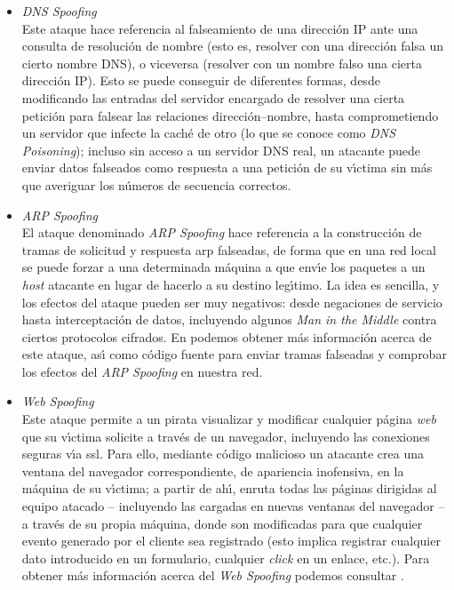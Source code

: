 \begin{itemize}
\item{\it DNS Spoofing}\\
Este ataque hace referencia al falseamiento de una direcci\'on IP ante una 
consulta de resoluci\'on de nombre (esto es, resolver con una direcci\'on falsa 
un cierto nombre DNS), o viceversa (resolver con un nombre falso una cierta
direcci\'on IP). Esto se puede conseguir de diferentes formas, desde modificando
las entradas del servidor encargado de resolver una cierta petici\'on para 
falsear las relaciones direcci\'on--nombre, hasta comprometiendo un servidor 
que infecte la cach\'e de otro (lo que se conoce como {\it DNS Poisoning});
incluso sin acceso a un servidor DNS real, un atacante puede enviar datos 
falseados como respuesta a una petici\'on de su v\'{\i}ctima sin m\'as que 
averiguar los n\'umeros de secuencia correctos.
\item{\it ARP Spoofing}\\
El ataque denominado {\it ARP Spoofing} hace referencia a la construcci\'on de 
tramas de solicitud y respuesta {\sc arp} falseadas, de forma que en una red
local se puede forzar a una determinada m\'aquina a que env\'{\i}e los paquetes
a un {\it host} atacante en lugar de hacerlo a su destino leg\'{\i}timo. La idea
es sencilla, y los efectos del ataque pueden ser muy negativos: desde negaciones
de servicio hasta interceptaci\'on de datos, incluyendo algunos {\it Man in 
the Middle} contra ciertos protocolos cifrados. En \cite{kn:vol97} podemos
obtener m\'as informaci\'on acerca de este ataque, as\'{\i} como c\'odigo 
fuente para enviar tramas falseadas y comprobar los efectos del {\it ARP 
Spoofing} en nuestra red.
\item{\it Web Spoofing}\\
Este ataque permite a un pirata visualizar y modificar cualquier p\'agina {\it
web} que su v\'{\i}ctima solicite a trav\'es de un navegador, incluyendo las
conexiones seguras v\'{\i}a {\sc ssl}. Para ello, mediante c\'odigo malicioso 
un atacante crea una ventana del navegador correspondiente, de apariencia 
inofensiva, en la m\'aquina de su v\'{\i}ctima; a partir de ah\'{\i}, enruta 
todas las p\'aginas dirigidas al equipo atacado -- incluyendo las cargadas en
nuevas ventanas del navegador -- a trav\'es de su propia 
m\'aquina, donde son modificadas para que cualquier evento generado por el 
cliente sea registrado (esto implica registrar cualquier dato introducido en un
formulario, cualquier {\it click} en un enlace, etc.). Para obtener m\'as 
informaci\'on acerca del {\it Web Spoofing} podemos consultar \cite{kn:fel96}.
\end{itemize}
